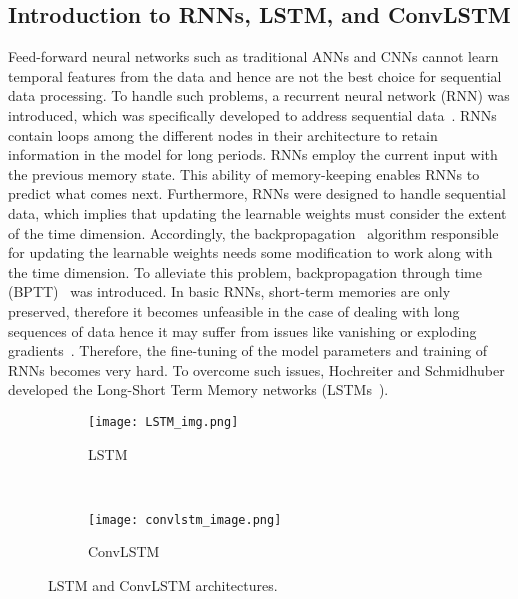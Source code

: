 \subsection{Introduction to RNNs, LSTM, and ConvLSTM}
Feed-forward neural networks such as traditional ANNs and CNNs cannot learn temporal features from the data and hence are not the best choice for sequential data processing.
To handle such problems, a recurrent neural network (RNN) was introduced, which was specifically developed to address sequential data~\cite{aggarwal2018neural, Lecun2015, goodfellow2016deep}. 
RNNs contain loops among the different nodes in their architecture to retain information in the model for long periods.
RNNs employ the current input with the previous memory state.
This ability of memory-keeping enables RNNs to predict what comes next. 
Furthermore, RNNs were designed to handle sequential data, which implies that updating the learnable weights must consider the extent of the time dimension. 
Accordingly, the backpropagation~\cite{Rumelhart1986} algorithm responsible for updating the learnable weights needs some modification to work along with the time dimension.
To alleviate this problem, backpropagation through time (BPTT)~\cite{aggarwal2018neural, goodfellow2016deep} was introduced. 
In basic RNNs, short-term memories are only preserved, therefore it becomes unfeasible in the case of dealing with long sequences of data hence it may suffer from issues like vanishing or exploding gradients~\cite{bengio1994learning}.
Therefore, the fine-tuning of the model parameters and training of RNNs becomes very hard.
To overcome such issues, Hochreiter and Schmidhuber developed the Long-Short Term Memory networks (LSTMs~\cite{Hochreiter1997}).
\begin{figure} [!h]
	\centering
	\begin{subfigure}[b]{1\textwidth}
		\centering
		\texttt{[image: LSTM\_img.png]}
		\caption{LSTM}
		\label{fig:LSTM}
	\end{subfigure}
	 \\ 
	 \hfill
	\begin{subfigure}[b]{1\textwidth}
		\centering
		\texttt{[image: convlstm\_image.png]}
		\caption{ConvLSTM}
		\label{fig:ConvLSTM}	
	\end{subfigure}
	\caption{LSTM and ConvLSTM architectures.}
	\label{fig:lstm_convlstm}
\end{figure}

